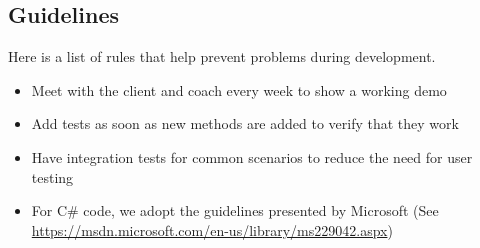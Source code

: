 \subsection{Guidelines}

Here is a list of rules that help prevent problems during development.

\begin{itemize}
	\item Meet with the client and coach every week to show a working demo
	\item Add tests as soon as new methods are added to verify that they work
	\item Have integration tests for common scenarios to reduce the need for user testing
	\item For C\# code, we adopt the guidelines presented by Microsoft
		  (See \url{https://msdn.microsoft.com/en-us/library/ms229042.aspx})
\end{itemize}